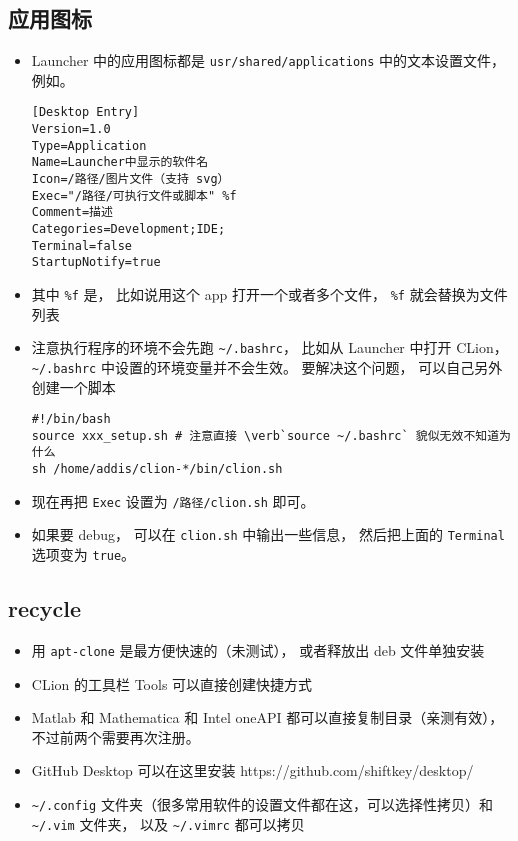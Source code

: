 \subsection{应用图标}
\begin{itemize}
\item Launcher 中的应用图标都是 \verb|usr/shared/applications| 中的文本设置文件， 例如。
\begin{lstlisting}[language=none,caption=xxx.desktop]
[Desktop Entry]
Version=1.0
Type=Application
Name=Launcher中显示的软件名
Icon=/路径/图片文件（支持 svg）
Exec="/路径/可执行文件或脚本" %f
Comment=描述
Categories=Development;IDE;
Terminal=false
StartupNotify=true
\end{lstlisting}
\item 其中 \verb|%f| 是， 比如说用这个 app 打开一个或者多个文件， \verb|%f| 就会替换为文件列表
\item 注意执行程序的环境不会先跑 \verb|~/.bashrc|， 比如从 Launcher 中打开 CLion， \verb|~/.bashrc| 中设置的环境变量并不会生效。 要解决这个问题， 可以自己另外创建一个脚本
\begin{lstlisting}[language=none,caption=clion.sh]
#!/bin/bash
source xxx_setup.sh # 注意直接 \verb`source ~/.bashrc` 貌似无效不知道为什么
sh /home/addis/clion-*/bin/clion.sh
\end{lstlisting}
\item 现在再把 \verb|Exec| 设置为 \verb|/路径/clion.sh| 即可。
\item 如果要 debug， 可以在 \verb|clion.sh| 中输出一些信息， 然后把上面的 \verb|Terminal| 选项变为 \verb|true|。
\end{itemize}


\subsection{recycle}
\begin{itemize}
\item 用 \verb`apt-clone` 是最方便快速的（未测试）， 或者释放出 deb 文件单独安装
\item CLion 的工具栏 Tools 可以直接创建快捷方式
\item Matlab 和 Mathematica 和 Intel oneAPI 都可以直接复制目录（亲测有效）， 不过前两个需要再次注册。
\item GitHub Desktop 可以在这里安装 https://github.com/shiftkey/desktop/
\item \verb`~/.config` 文件夹（很多常用软件的设置文件都在这，可以选择性拷贝）和 \verb`~/.vim` 文件夹， 以及 \verb`~/.vimrc` 都可以拷贝
\end{itemize}
